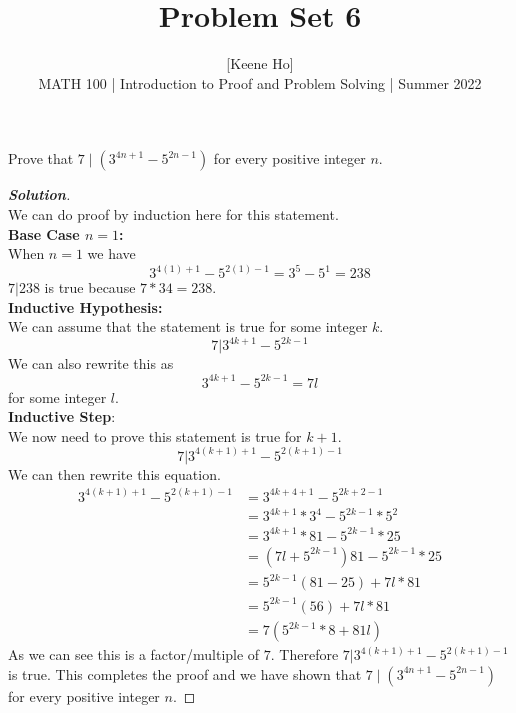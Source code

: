 \documentclass[11pt]{article}
\newenvironment{problem}[2][Problem\!]{\begin{trivlist}
\item[\hskip \labelsep {\bfseries #1}\hskip \labelsep {\bfseries #2.}]}{\end{trivlist}}
\newenvironment{solution}{\begin{proof}[\textbf{\textit{Solution}}]}{\end{proof}}
\begin{document}
 
\title{Problem Set 6}
\author{[Keene Ho]\\[0.5em]
MATH 100 | Introduction to Proof and Problem Solving | Summer 2022}
\date{} 
\maketitle


\begin{problem}{6.1}
Prove that $7 \mid (3^{4n+1} - 5^{2n-1})$ for every positive integer $n$.
\end{problem}
\begin{solution}\hfill \\%
We can do proof by induction here for this statement.\\
\textbf{Base Case    \(n = 1\):}\\
When \(n = 1\) we have
\[3^{4(1)+1}-5^{2(1)-1} = 3^{5}-5^1 = 238\]
\(7 | 238\) is true because \(7 * 34 = 238\).\\
\textbf{Inductive Hypothesis:}\\
We can assume that the statement is true for some integer \(k\).
\[7 | 3^{4k+1}-5^{2k-1}\]
We can also rewrite this as 
\[3^{4k+1}-5^{2k-1} = 7l\]
for some integer \(l\).\\
\textbf{Inductive Step}:\\
We now need to prove this statement is true for \(k + 1\).
\[7 | 3^{4(k+1)+1}-5^{2(k+1)-1}\]
We can then rewrite this equation.
\begin{align*}
3^{4(k+1)+1}-5^{2(k+1)-1} &= 3^{4k+4+1}-5^{2k+2-1}\\
&= 3^{4k+1}*3^{4}-5^{2k-1}*5^{2}\\
&= 3^{4k+1}*81 - 5^{2k-1}*25\\
&= (7l+5^{2k-1})81 - 5^{2k-1}*25\\
&= 5^{2k-1}(81-25) +7l * 81\\
&= 5^{2k-1}(56) +7l * 81\\
&= 7(5^{2k-1}*8+81l)
\end{align*}
As we can see this is a factor/multiple of \(7\). Therefore \(7 | 3^{4(k+1)+1}-5^{2(k+1)-1}\) is true. This completes the proof and we have shown that $7 \mid (3^{4n+1} - 5^{2n-1})$ for every positive integer $n$.
\end{solution}

\newpage %
\end{document}
